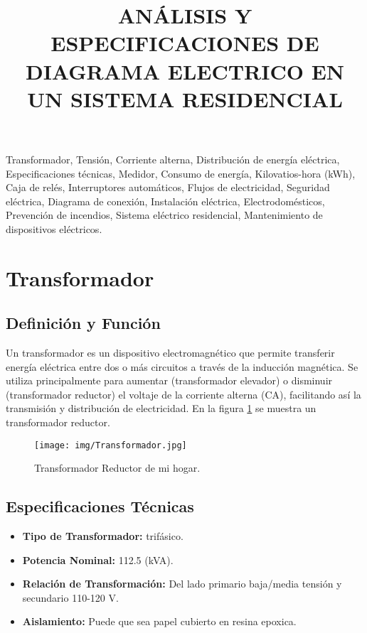 \documentclass[conference]{IEEEtran}
\author{\IEEEauthorblockN{Daniel Fernando Aranda Contreras}
\IEEEauthorblockA{Escuela E3T, Universidad Industrial de Santander\\
Correo electrónico: \{daniel2221648\}@correo.uis.edu.co}}
\theoremstyle{mytheoremstyle}
\theoremstyle{mytheoremstyle}
\theoremstyle{myproblemstyle}
\begin{document}
        \title{\uppercase{Análisis y Especificaciones de diagrama electrico en un sistema Residencial}}
        \maketitle
        \begin{IEEEkeywords}
            Transformador, Tensión, Corriente alterna, Distribución de energía eléctrica, Especificaciones técnicas, Medidor, Consumo de energía, Kilovatios-hora (kWh), Caja de relés, Interruptores automáticos, Flujos de electricidad, Seguridad eléctrica, Diagrama de conexión, Instalación eléctrica, Electrodomésticos, Prevención de incendios, Sistema eléctrico residencial, Mantenimiento de dispositivos eléctricos.
        \end{IEEEkeywords}




        \section{Transformador}
        
        \subsection{Definición y Función}
        Un transformador es un dispositivo electromagnético que permite transferir energía eléctrica entre dos o más circuitos a través de la inducción magnética. Se utiliza principalmente para aumentar (transformador elevador) o disminuir (transformador reductor) el voltaje de la corriente alterna (CA), facilitando así la transmisión y distribución de electricidad. En la figura \ref{fig:Tansformador} se muestra un transformador reductor.
        \begin{figure}[h] %
            \centering
            \texttt{[image: img/Transformador.jpg]} %
            \caption{Transformador Reductor de mi hogar.}
            \label{fig:Tansformador}
        \end{figure}


        \subsection{Especificaciones Técnicas}
        \begin{itemize}
            \item \textbf{Tipo de Transformador:} trifásico.
            \item \textbf{Potencia Nominal:} 112.5 (kVA).
            \item \textbf{Relación de Transformación:} Del lado primario baja/media tensión y secundario 110-120 V.
            \item \textbf{Aislamiento:} Puede que sea papel cubierto en resina epoxica.
        \end{itemize}
        
\end{document}
